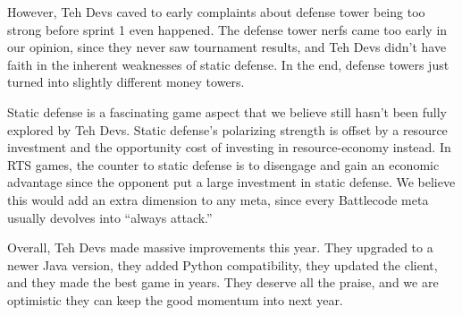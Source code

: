 \medskip

However, Teh Devs caved to early complaints about defense tower being too strong before sprint 1 even happened. The defense tower nerfs came too early in our opinion, since they never saw tournament results, and Teh Devs didn't have faith in the inherent weaknesses of static defense. In the end, defense towers just turned into slightly different money towers.

\medskip

Static defense is a fascinating game aspect that we believe still hasn't been fully explored by Teh Devs. Static defense's polarizing strength is offset by a resource investment and the opportunity cost of investing in resource-economy instead. In RTS games, the counter to static defense is to disengage and gain an economic advantage since the opponent put a large investment in static defense. We believe this would add an extra dimension to any meta, since every Battlecode meta usually devolves into ``always attack.''

\medskip

Overall, Teh Devs made massive improvements this year. They upgraded to a newer Java version, they added Python compatibility, they updated the client, and they made the best game in years. They deserve all the praise, and we are optimistic they can keep the good momentum into next year.
